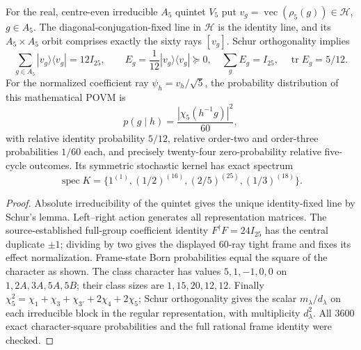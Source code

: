 \documentclass[11pt]{article}
\begin{document}
\begin{theorem}
\label{p1b:thm:coefficient-orbit-povm}
For the real, centre-even irreducible $A_5$ quintet $V_5$ put
$v_g=\operatorname{vec}(\rho_5(g))\in\mathcal H$, $g\in A_5$.
The diagonal-conjugation-fixed line in $\mathcal H$ is the identity line,
and its $A_5\times A_5$ orbit comprises exactly the sixty rays $[v_g]$.
Schur orthogonality implies
\[
 \sum_{g\in A_5}|v_g\rangle\langle v_g|=12I_{25},\qquad
 E_g=\frac1{12}|v_g\rangle\langle v_g|\succeq0,\quad
 \sum_g E_g=I_{25},\quad\operatorname{tr}E_g=5/12.
\]
For the normalized coefficient ray $\psi_h=v_h/\sqrt5$, the
probability distribution of this mathematical POVM is
\[
 \boxed{p(g\mid h)=\frac{|\chi_5(h^{-1}g)|^2}{60}},
\]
with relative identity probability $5/12$, relative order-two and
order-three probabilities $1/60$ each, and precisely twenty-four
zero-probability relative five-cycle outcomes. Its symmetric stochastic
kernel has exact spectrum
\[
 \boxed{\operatorname{spec}K=
 \{1^{(1)},(1/2)^{(16)},(2/5)^{(25)},(1/3)^{(18)}\}.}
\]
\end{theorem}
\begin{proof}
Absolute irreducibility of the quintet gives the unique identity-fixed
line by Schur's lemma. Left--right action generates all representation
matrices. The source-established full-group coefficient identity
$F^\dagger F=24I_{25}$ has the central duplicate $\pm1$;
dividing by two gives the displayed $60$-ray tight frame and fixes
its effect normalization. Frame-state Born probabilities equal the
square of the character as shown. The class character has values
$5,1,-1,0,0$ on $1,2A,3A,5A,5B$; their class sizes are
$1,15,20,12,12$. Finally
$\chi_5^2=\chi_1+\chi_3+\chi_{3'}+2\chi_4+2\chi_5$;
Schur orthogonality gives the scalar $m_\lambda/d_\lambda$
on each irreducible block in the regular representation, with
multiplicity $d_\lambda^2$. All $3600$ exact character-square
probabilities and the full rational frame identity were checked.
\end{proof}
\end{document}
